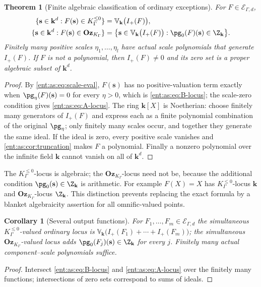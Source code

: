 \documentclass[11pt]{article}
\newtheorem{theorem}{Theorem}[section]
\theoremstyle{plain}
\theoremstyle{plain}
\theoremstyle{plain}
\newtheorem{corollary}[corollary]{Corollary}
\theoremstyle{definition}
\theoremstyle{definition}
\theoremstyle{definition}
\theoremstyle{definition}
\theoremstyle{remark}
\newcommand{\K}{K_\Gamma}\newcommand{\KD}{K_\Delta}
\newcommand{\kk}{\mathbf k}\newcommand{\PP}{\mathbb P}
\newcommand{\Oz}{\mathbf{Oz}}\newcommand{\Ed}{\mathcal E_{\Gamma,d}}
\newcommand{\Kle}{K_\Gamma^{\le0}}\DeclareMathOperator{\Jac}{Jac}
\newcommand{\Zk}{\Z_{\kk}}\newcommand{\OzK}{\Oz_{\K}}
\begin{document}
\begin{theorem}[Finite algebraic classification of ordinary exceptions]
\label{ent:as:thm:tail}
For $F\in\Ed$,
\begin{align}
 \{\mathbf s\in\kk^d:F(\mathbf s)\in\Kle\}
 &=\mathbb V_\kk\bigl(I_+(F)\bigr),\label{ent:as:eq:B-locus}\\
 \{\mathbf s\in\kk^d:F(\mathbf s)\in\OzK\}
 &=\bigl\{\mathbf s\in\mathbb V_\kk\bigl(I_+(F)\bigr):
 \pg_0(F)(\mathbf s)\in\Zk\bigr\}.\label{ent:as:eq:A-locus}
\end{align}
Finitely many positive scales $\eta_1,\ldots,\eta_l$ have actual scale
polynomials that generate $I_+(F)$. If $F$ is not a polynomial, then
$I_+(F)\ne0$ and its zero set is a proper algebraic subset of $\kk^d$.
\end{theorem}
\begin{proof}
By \eqref{ent:as:eq:scale-eval}, $F(\mathbf s)$ has no positive-valuation term
exactly when $\pg_\eta(F)(\mathbf s)=0$ for every $\eta>0$, which is
\eqref{ent:as:eq:B-locus}; the scale-zero condition gives
\eqref{ent:as:eq:A-locus}. The ring $\kk[X]$ is Noetherian: choose finitely
many generators of $I_+(F)$ and express each as a finite polynomial
combination of the original $\pg_\eta$; only finitely many scales occur, and
together they generate the same ideal. If the ideal is zero, every positive
scale vanishes and \cref{ent:as:cor:truncation} makes $F$ a polynomial.
Finally a nonzero polynomial over the infinite field $\kk$ cannot vanish on
all of $\kk^d$.
\end{proof}

The $\Kle$-locus is algebraic; the $\OzK$-locus need not be, because the
additional condition $\pg_0(\mathbf s)\in\Zk$ is arithmetic. For example
$F(X)=X$ has $\Kle$-locus $\kk$ and $\OzK$-locus $\Zk$. This distinction
prevents replacing the exact formula by a blanket algebraicity assertion for
all omnific-valued points.

\begin{corollary}[Several output functions]\label{ent:as:cor:several}
For $F_1,\ldots,F_m\in\Ed$ the simultaneous $\Kle$-valued ordinary locus is
$\mathbb V_\kk\bigl(I_+(F_1)+\cdots+I_+(F_m)\bigr)$; the simultaneous
$\OzK$-valued locus adds $\pg_0(F_j)(\mathbf s)\in\Zk$ for every $j$. Finitely
many actual component--scale polynomials suffice.
\end{corollary}
\begin{proof}
Intersect \eqref{ent:as:eq:B-locus} and \eqref{ent:as:eq:A-locus} over the
finitely many functions; intersections of zero sets correspond to sums of
ideals.
\end{proof}
\end{document}
